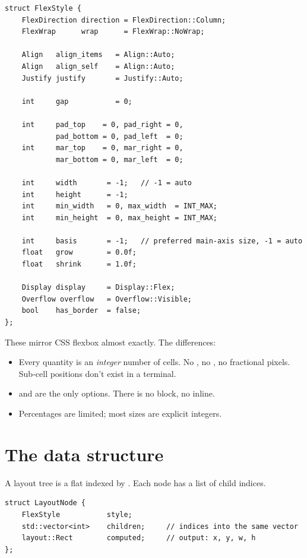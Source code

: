 \begin{lstlisting}
struct FlexStyle {
    FlexDirection direction = FlexDirection::Column;
    FlexWrap      wrap      = FlexWrap::NoWrap;

    Align   align_items   = Align::Auto;
    Align   align_self    = Align::Auto;
    Justify justify       = Justify::Auto;

    int     gap           = 0;

    int     pad_top    = 0, pad_right = 0,
            pad_bottom = 0, pad_left  = 0;
    int     mar_top    = 0, mar_right = 0,
            mar_bottom = 0, mar_left  = 0;

    int     width       = -1;   // -1 = auto
    int     height      = -1;
    int     min_width   = 0, max_width  = INT_MAX;
    int     min_height  = 0, max_height = INT_MAX;

    int     basis       = -1;   // preferred main-axis size, -1 = auto
    float   grow        = 0.0f;
    float   shrink      = 1.0f;

    Display display     = Display::Flex;
    Overflow overflow   = Overflow::Visible;
    bool    has_border  = false;
};
\end{lstlisting}

These mirror CSS flexbox almost exactly. The differences:

\begin{itemize}[leftmargin=*]
  \item Every quantity is an \emph{integer} number of cells. No
    , no , no fractional pixels. Sub-cell positions
    don't exist in a terminal.
  \item {} and  are the only
    options. There is no block, no inline.
  \item Percentages are limited; most sizes are explicit integers.
\end{itemize}

\section{The data structure}

A layout tree is a flat  indexed by
. Each node has a list of child indices.

\begin{lstlisting}
struct LayoutNode {
    FlexStyle           style;
    std::vector<int>    children;     // indices into the same vector
    layout::Rect        computed;     // output: x, y, w, h
};
\end{lstlisting}

